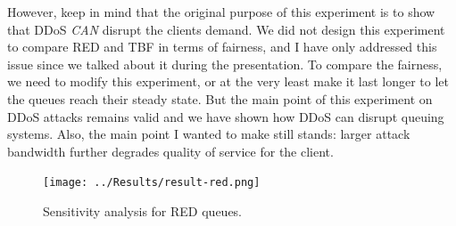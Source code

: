 \documentclass[12pt,twocolumn]{article}
\begin{document}
However, keep in mind that the original purpose of this experiment is to show that DDoS \emph{CAN} disrupt the clients demand. We did not design this experiment to compare RED and TBF in terms of fairness, and I have only addressed this issue since we talked about it during the presentation.
To compare the fairness, we need to modify this experiment, or at the very least make it last longer to let the queues reach their steady state.
But the main point of this experiment on DDoS attacks remains valid and we have shown how DDoS can disrupt queuing systems.
Also, the main point I wanted to make still stands: larger attack bandwidth further degrades quality of service for the client.

\begin{figure}[t!]
    \centering
    \texttt{[image: ../Results/result-red.png]} \caption{Sensitivity analysis for RED queues.} \label{red2}
\end{figure}



\end{document}
